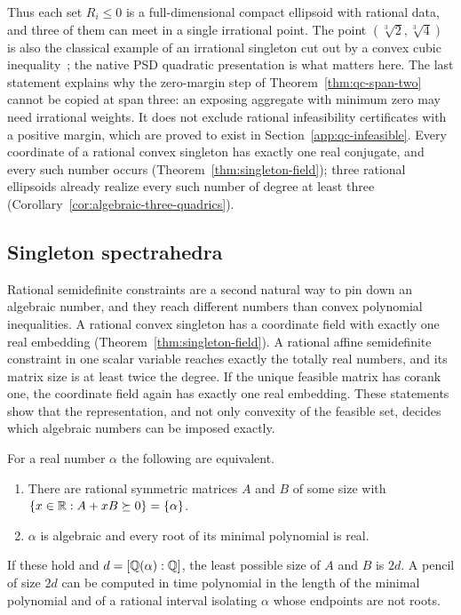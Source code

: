 Thus each set $R_i\le0$ is a full-dimensional compact ellipsoid with rational
data, and three of them can meet in a single irrational point. The point
$(\sqrt[3]2,\sqrt[3]4)$ is also the classical example of an irrational
singleton cut out by a convex cubic inequality~\cite{BienstockDelPiaHildebrand2023};
the native PSD quadratic presentation is what matters here. The last
statement explains why the zero-margin step of Theorem~\ref{thm:qc-span-two}
cannot be copied at span three: an exposing aggregate with minimum zero may
need irrational weights. It does not exclude rational infeasibility
certificates with a positive margin, which are proved to exist in
Section~\ref{app:qc-infeasible}. Every coordinate of a rational convex
singleton has exactly one real conjugate, and every such number occurs
(Theorem~\ref{thm:singleton-field}); three rational ellipsoids already
realize every such number of degree at least three
(Corollary~\ref{cor:algebraic-three-quadrics}).

\subsection{Singleton spectrahedra}
\label{app:qc-spectra}

Rational semidefinite constraints are a second natural way to pin down an
algebraic number, and they reach different numbers than convex polynomial
inequalities. A rational convex singleton has a coordinate field with exactly
one real embedding (Theorem~\ref{thm:singleton-field}). A rational affine
semidefinite constraint in one scalar variable reaches exactly the totally
real numbers, and its matrix size is at least twice the degree. If the unique
feasible matrix has corank one, the coordinate field again has exactly one
real embedding. These statements show that the representation, and not only
convexity of the feasible set, decides which algebraic numbers can be imposed
exactly.

\begin{theorem}
\label{thm:qc-pencil}
For a real number $\alpha$ the following are equivalent.
\begin{enumerate}[label=(\roman*),leftmargin=*]
\item There are rational symmetric matrices $A$ and $B$ of some size with
$\{x\in\mathbb R:A+xB\succeq0\}=\{\alpha\}$.
\item $\alpha$ is algebraic and every root of its minimal polynomial is real.
\end{enumerate}
If these hold and $d=[\mathbb Q(\alpha):\mathbb Q]$, the least possible size of $A$ and
$B$ is $2d$. A pencil of size $2d$ can be computed in time polynomial in the
length of the minimal polynomial and of a rational interval isolating
$\alpha$ whose endpoints are not roots.
\end{theorem}

